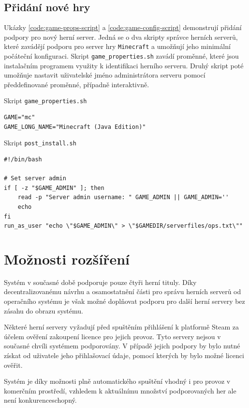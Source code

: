 \subsection{Přidání nové hry}

Ukázky \ref{code:game-props-script} a \ref{code:game-config-script} demonstrují přidání podpory pro nový herní server. Jedná se o dva skripty správce herních serverů,
které zavádějí podporu pro server hry \texttt{Minecraft} a umožňují jeho minimální počáteční konfiguraci.
Skript \texttt{game_properties.sh} zavádí proměnné, které jsou instalačním programem využity k identifikaci herního serveru.
Druhý skript poté umožňuje nastavit uživatelské jméno administrátora serveru pomocí předdefinované proměnné, případně interaktivně.

\begin{listing}[h]
    \caption{Skript \texttt{game_properties.sh}}
    \label{code:game-props-script}
    \begin{verbatim}
GAME="mc"
GAME_LONG_NAME="Minecraft (Java Edition)"
    \end{verbatim}
\end{listing}

\begin{listing}[h]
    \caption{Skript \texttt{post_install.sh}}
    \label{code:game-config-script}
    \begin{verbatim}
#!/bin/bash

# Set server admin
if [ -z "$GAME_ADMIN" ]; then
    read -p "Server admin username: " GAME_ADMIN || GAME_ADMIN=''
    echo
fi
run_as_user "echo \"$GAME_ADMIN\" > \"$GAMEDIR/serverfiles/ops.txt\""
    \end{verbatim}
\end{listing}

\section{Možnosti rozšíření}

Systém v současné době podporuje pouze čtyři herní tituly. Díky decentralizovanému návrhu
a osamostatnění části pro správu herních serverů od operačního systému je však možné doplňovat podporu
pro další herní servery bez zásahu do obrazu systému.

Některé herní servery vyžadují před spuštěním přihlášení k platformě Steam za účelem ověření zakoupení licence
pro jejich provoz. Tyto servery nejsou v současné chvíli systémem podporovány. V případě jejich podpory
by bylo nutné získat od uživatele jeho přihlašovací údaje, pomocí kterých by bylo možné licenci ověřit.

Systém je díky možnosti plně automatického spuštění vhodný i pro provoz v komerčním prostředí, vzhledem k aktuálnímu
množství podporovaných her ale není konkurenceschopný.

